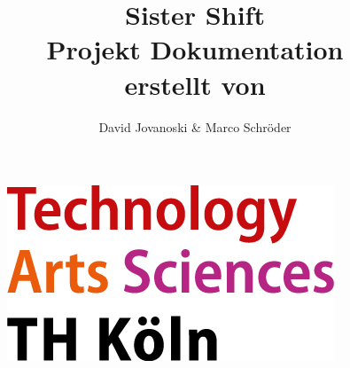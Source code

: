 \documentclass[11pt,
paper=a4,
bibtotocnumbered,	  %
liststotocnumbered,  %
DIV=calc,		  %
tablecaptionabove,	  %
headinclude,
]{article}
\title{\textbf{Sister Shift} \\ Projekt Dokumentation \\ erstellt von}
\author{David Jovanoski & Marco Schröder}
\date{\parbox{\linewidth}{\centering%
  \today\endgraf\bigskip
  Prof. Dr. Kristian Fischer \hspace*{1cm} Prof. Dr. Gerhard Hartmann\endgraf\medskip
 Entwicklungsprojekt interaktive Systeme \endgraf
 \vspace{0.5cm}
  TH Köln}}
\begin{document}
\begin{figure}
\includegraphics[scale=1]{Bilder/Logo_TH-Koeln_RGB_17pt.jpg}
\end{figure}
\maketitle
\newpage
\tableofcontents
\listoffigures
\end{document}
